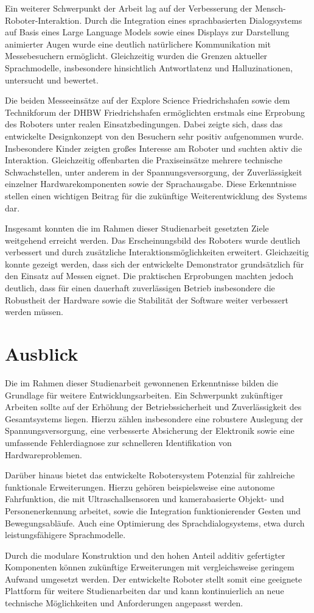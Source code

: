 Ein weiterer Schwerpunkt der Arbeit lag auf der Verbesserung der Mensch-Roboter-Interaktion. Durch die Integration eines sprachbasierten Dialogsystems auf Basis eines Large Language Models sowie eines Displays zur Darstellung animierter Augen wurde eine deutlich natürlichere Kommunikation mit Messebesuchern ermöglicht. Gleichzeitig wurden die Grenzen aktueller Sprachmodelle, insbesondere hinsichtlich Antwortlatenz und Halluzinationen, untersucht und bewertet.

Die beiden Messeeinsätze auf der Explore Science Friedrichshafen sowie dem Technikforum der DHBW Friedrichshafen ermöglichten erstmals eine Erprobung des Roboters unter realen Einsatzbedingungen. Dabei zeigte sich, dass das entwickelte Designkonzept von den Besuchern sehr positiv aufgenommen wurde. Insbesondere Kinder zeigten großes Interesse am Roboter und suchten aktiv die Interaktion. Gleichzeitig offenbarten die Praxiseinsätze mehrere technische Schwachstellen, unter anderem in der Spannungsversorgung, der Zuverlässigkeit einzelner Hardwarekomponenten sowie der Sprachausgabe. Diese Erkenntnisse stellen einen wichtigen Beitrag für die zukünftige Weiterentwicklung des Systems dar.

Insgesamt konnten die im Rahmen dieser Studienarbeit gesetzten Ziele weitgehend erreicht werden. Das Erscheinungsbild des Roboters wurde deutlich verbessert und durch zusätzliche Interaktionsmöglichkeiten erweitert. Gleichzeitig konnte gezeigt werden, dass sich der entwickelte Demonstrator grundsätzlich für den Einsatz auf Messen eignet. Die praktischen Erprobungen machten jedoch deutlich, dass für einen dauerhaft zuverlässigen Betrieb insbesondere die Robustheit der Hardware sowie die Stabilität der Software weiter verbessert werden müssen.

\section*{Ausblick}

Die im Rahmen dieser Studienarbeit gewonnenen Erkenntnisse bilden die Grundlage für weitere Entwicklungsarbeiten. Ein Schwerpunkt zukünftiger Arbeiten sollte auf der Erhöhung der Betriebssicherheit und Zuverlässigkeit des Gesamtsystems liegen. Hierzu zählen insbesondere eine robustere Auslegung der Spannungsversorgung, eine verbesserte Absicherung der Elektronik sowie eine umfassende Fehlerdiagnose zur schnelleren Identifikation von Hardwareproblemen.

Darüber hinaus bietet das entwickelte Robotersystem Potenzial für zahlreiche funktionale Erweiterungen. Hierzu gehören beispielsweise eine autonome Fahrfunktion, die mit Ultraschallsensoren und kamerabasierte Objekt- und Personenerkennung arbeitet, sowie die Integration funktionierender Gesten und Bewegungsabläufe. Auch eine Optimierung des Sprachdialogsystems, etwa durch leistungsfähigere Sprachmodelle.

Durch die modulare Konstruktion und den hohen Anteil additiv gefertigter Komponenten können zukünftige Erweiterungen mit vergleichsweise geringem Aufwand umgesetzt werden. Der entwickelte Roboter stellt somit eine geeignete Plattform für weitere Studienarbeiten dar und kann kontinuierlich an neue technische Möglichkeiten und Anforderungen angepasst werden.